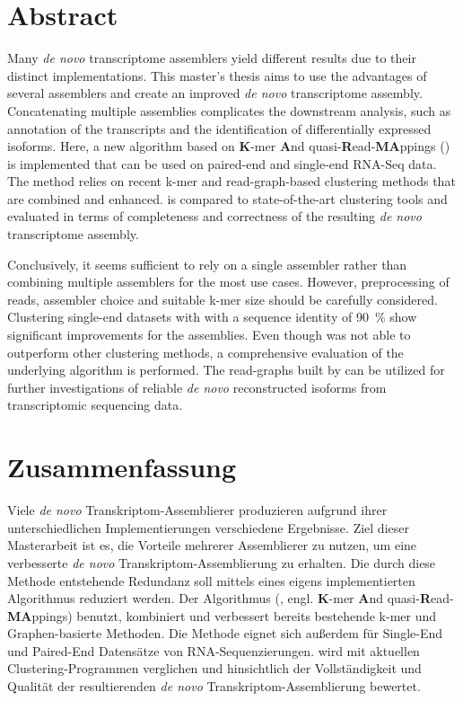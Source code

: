\documentclass[12pt,a4paper,english]{article}
\begin{document}
\section*{Abstract}
	Many \textit{de novo} transcriptome assemblers yield different results due to their distinct implementations. This master's thesis aims to use the advantages of several assemblers and create an improved \textit{de novo} transcriptome assembly. Concatenating multiple assemblies complicates the downstream analysis, such as annotation of the transcripts and the identification of differentially expressed isoforms. Here, a new algorithm based on \textbf{K}-mer \textbf{A}nd quasi-\textbf{R}ead-\textbf{MA}ppings (\karma) is implemented that can be used on paired-end and single-end RNA-Seq data. The method relies on recent k-mer and read-graph-based clustering methods that are combined and enhanced. \karma is compared to state-of-the-art clustering tools and evaluated in terms of completeness and correctness of the resulting \textit{de novo} transcriptome assembly.
	
	Conclusively, it seems sufficient to rely on a single assembler rather than combining multiple assemblers for the most use cases. However, preprocessing of reads, assembler choice and suitable k-mer size should be carefully considered. Clustering single-end datasets with \cdhit with a sequence identity of 90~\% show significant improvements for the assemblies.
	Even though \karma was not able to outperform other clustering methods, a comprehensive evaluation of the underlying algorithm is performed. The read-graphs built by \karma can be utilized for further investigations of reliable \textit{de novo} reconstructed isoforms from transcriptomic sequencing data.

\newpage
\section*{Zusammenfassung}
    Viele \textit{de novo} Transkriptom-Assemblierer produzieren aufgrund ihrer unter\-schied\-lichen Implementierungen verschiedene Ergebnisse. Ziel dieser Masterarbeit ist es, die Vorteile mehrerer Assemblierer zu nutzen, um eine verbesserte \textit{de novo} Transkriptom-Assemblierung zu erhalten. Die durch diese Methode entstehende Redundanz soll mittels eines eigens implementierten Algorithmus reduziert werden. Der Algorithmus (\karma, engl. \textbf{K}-mer \textbf{A}nd quasi-\textbf{R}ead-\textbf{MA}ppings) benutzt, kombiniert und verbessert bereits bestehende k-mer und Graphen-basierte Methoden.
    Die Methode eignet sich außerdem für Single-End und Paired-End Datensätze von RNA-Sequenzierungen.
    \karma wird mit aktuellen Clustering-Programmen verglichen und hinsichtlich der Vollständigkeit und Qualität der resultierenden \textit{de novo} Transkriptom-Assemblierung bewertet.
    
\end{document}
